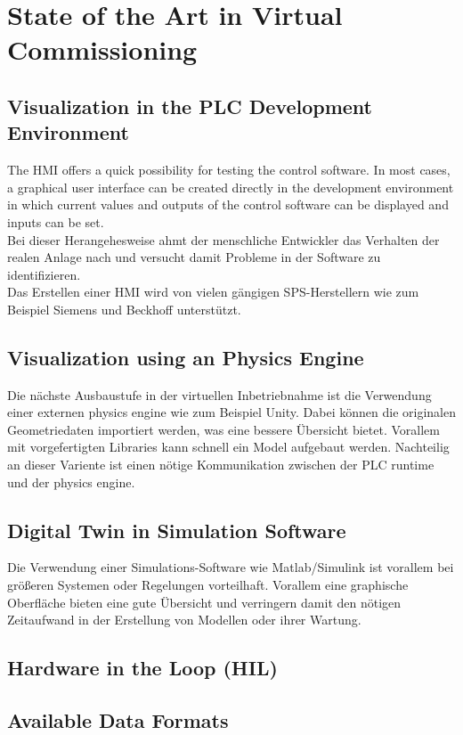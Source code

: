 \chapter{State of the Art in Virtual Commissioning}
\section{Visualization in the PLC Development Environment}			%
	The \ac{HMI} offers a quick possibility for testing the control software. In most cases, a graphical user interface can be created directly in the development environment in which current values and outputs of the control software can be displayed and inputs can be set.\\
	Bei dieser Herangehesweise ahmt der menschliche Entwickler das Verhalten der realen Anlage nach und versucht damit Probleme in der Software zu identifizieren. \\
	Das Erstellen einer \ac{HMI} wird von vielen gängigen SPS-Herstellern wie zum Beispiel Siemens und Beckhoff unterstützt. 
	
\section{Visualization using an Physics Engine}		%
	Die nächste Ausbaustufe in der virtuellen Inbetriebnahme ist die Verwendung einer externen physics engine wie zum Beispiel Unity. Dabei können die originalen Geometriedaten importiert werden, was eine bessere Übersicht bietet. Vorallem mit vorgefertigten Libraries kann schnell ein Model aufgebaut werden. 
Nachteilig an dieser Variente ist einen nötige Kommunikation zwischen der PLC runtime und der physics engine. 

\section{Digital Twin in Simulation Software}		%
	Die Verwendung einer Simulations-Software wie Matlab/Simulink ist vorallem bei größeren Systemen oder Regelungen vorteilhaft. Vorallem eine graphische Oberfläche bieten eine gute Übersicht und verringern damit den nötigen Zeitaufwand in der Erstellung von Modellen oder ihrer Wartung.

\section{Hardware in the Loop (HIL)}


\section{Available Data Formats}
